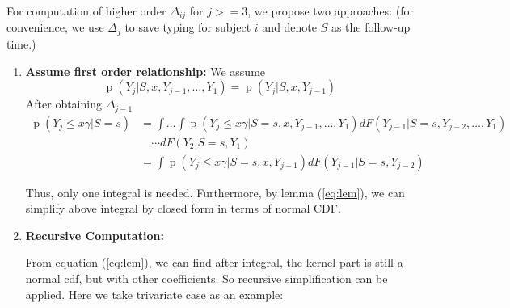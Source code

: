 \documentclass[12pt]{article}
\DeclareMathOperator{\pr}{p}
\begin{document}
For computation of higher order $\Delta_{ij}$ for $j >= 3$, we propose
two approaches: (for convenience, we use $\Delta_j$ to save typing for
subject $i$ and denote $S$ as the follow-up time.)

\begin{enumerate}
\item \textbf{Assume first order relationship:} We assume
  \begin{equation}
    \pr (Y_j|S, x, Y_{j-1}, \ldots, Y_1) = \pr (Y_j|S, x, Y_{j-1})
  \end{equation}
  After obtaining $\Delta_{j-1}$
  \begin{align*}
    \pr (Y_j \leq  x\gamma | S = s) & =  \int\dots\int \pr (Y_j \leq x\gamma | S=s, x, Y_{j-1}, \ldots, Y_1) dF(Y_{j-1}|S=s, Y_{j-2}, \ldots, Y_1)\\
    & \quad  \cdots dF(Y_2|S=s, Y_1) \\
    & = \int \pr (Y_j \leq x\gamma | S=s, x, Y_{j-1}) dF(Y_{j-1}|S=s,
    Y_{j-2})
  \end{align*}

  Thus, only one integral is needed. Furthermore, by lemma
  (\ref{eq:lem}), we can simplify above integral by closed form in
  terms of normal CDF.

\item \textbf{Recursive Computation: }

  From equation (\ref{eq:lem}), we can find after integral, the kernel
  part is still a normal cdf, but with other coefficients. So
  recursive simplification can be applied. Here we take trivariate
  case as an example:


\end{enumerate}
\end{document}
